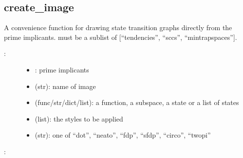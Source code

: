 \documentclass[letterpaper,10pt,english]{sphinxmanual}
\begin{document}
\subsection{create\_image}
\label{\detokenize{StateTransitionGraphs:create-image}}\label{\detokenize{StateTransitionGraphs:stgs-create-image}}

\begin{fulllineitems}
\label{\detokenize{StateTransitionGraphs:PyBoolNet.StateTransitionGraphs.create_image}}
A convenience function for drawing state transition graphs directly from the prime implicants.
 must be a sublist of {[}“tendencies”, “sccs”, “mintrapspaces”{]}.
\begin{description}
\item[{:}] \leavevmode\begin{itemize}
\item {} 
: prime implicants

\item {} 
 (str): name of image

\item {} 
 (func/str/dict/list): a function, a subspace, a state or a list of states

\item {} 
 (list): the styles to be applied

\item {} 
 (str): one of “dot”, “neato”, “fdp”, “sfdp”, “circo”, “twopi”

\end{itemize}

\end{description}

:

\begin{sphinxVerbatim}[commandchars=\\\{\}]
   \PYG{p}{[} \PYG{p}{]}
\end{sphinxVerbatim}

\end{fulllineitems}
\end{document}
